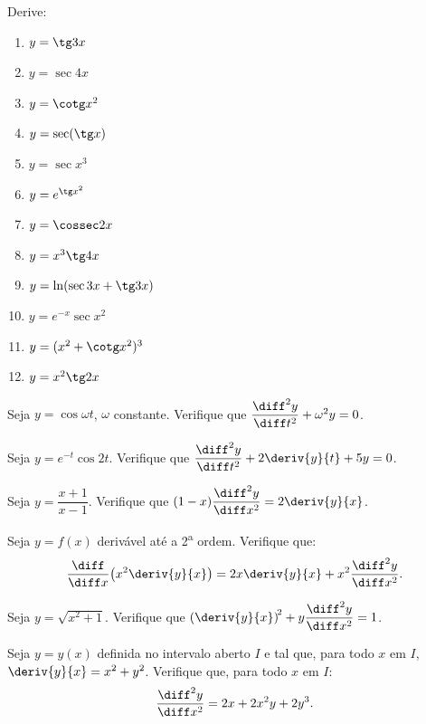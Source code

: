 \begin{exercicio}[16]
Derive:
\begin{enumerate}[label=\alph*)]
    \item $y = \tg 3x$
    \item $y = \sec 4x$
    \item $y = \cotg x^2$
    \item $y = \sec(\tg x)$
    \item $y = \sec x^3$
    \item $y = e^{\tg x^2}$
    \item $y = \cossec 2x$
    \item $y = x^3 \tg 4x$
    \item $y = \ln(\sec 3x + \tg 3x)$
    \item $y = e^{-x}\sec x^2$
    \item $y = (x^2 + \cotg x^2)^3$
    \item $y = x^2 \tg 2x$
\end{enumerate}
\end{exercicio}

\begin{exercicio}[17]
Seja $y = \cos \omega t$, $\omega$ constante. Verifique que $\dfrac{\diff^2 y}{\diff t^2} + \omega^2 y = 0$.
\end{exercicio}

\begin{exercicio}[18]
Seja $y = e^{-t}\cos 2t$. Verifique que $\dfrac{\diff^2 y}{\diff t^2} + 2\deriv{y}{t} + 5y = 0$.
\end{exercicio}

\begin{exercicio}[19]
Seja $y = \dfrac{x + 1}{x - 1}$. Verifique que $(1 - x)\dfrac{\diff^2 y}{\diff x^2} = 2\deriv{y}{x}$.
\end{exercicio}

\begin{exercicio}[20]
Seja $y = f(x)$ derivável até a 2\textsuperscript{a} ordem. Verifique que:
\[
\frac{\diff}{\diff x}\!\left(x^2 \deriv{y}{x}\right) = 2x\deriv{y}{x} + x^2 \frac{\diff^2 y}{\diff x^2}.
\]
\end{exercicio}

\begin{exercicio}[21]
Seja $y = \sqrt{x^2 + 1}$. Verifique que $\left(\deriv{y}{x}\right)^{\!2} + y\dfrac{\diff^2 y}{\diff x^2} = 1$.
\end{exercicio}

\begin{exercicio}[22]
Seja $y = y(x)$ definida no intervalo aberto $I$ e tal que, para todo $x$ em $I$, $\deriv{y}{x} = x^2 + y^2$. Verifique que, para todo $x$ em $I$:
\[
\frac{\diff^2 y}{\diff x^2} = 2x + 2x^2 y + 2y^3.
\]
\end{exercicio}

